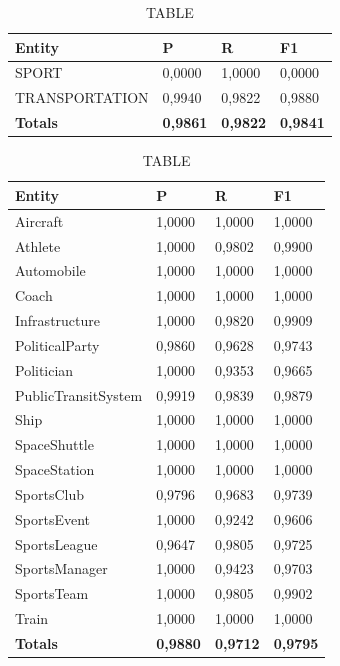 \documentclass[thesis=M,english]{FITthesis}[2018/05/30]
\begin{document}
	\begin{table}[H]\centering
		\caption{TABLE}
		\label{}
		\begin{tabular}{|l|l|l|l|}
			\hline {\textbf{Entity}} & {\textbf{P}} & {\textbf{R}} & {\textbf{F1}}\\\hline
				SPORT & 0,0000 & 1,0000 & 0,0000\\
				TRANSPORTATION & 0,9940 & 0,9822 & 0,9880\\\hline
				\textbf{Totals} & \textbf{0,9861} & \textbf{0,9822} & \textbf{0,9841}\\\hline
		\end{tabular}
	\end{table}	
		


\begin{table}[H]\centering
		\caption{TABLE}
		\label{}
		\begin{tabular}{|l|l|l|l|}
			\hline {\textbf{Entity}} & {\textbf{P}} & {\textbf{R}} & {\textbf{F1}}\\\hline
				Aircraft & 1,0000 & 1,0000 & 1,0000\\
				Athlete & 1,0000 & 0,9802 & 0,9900\\
				Automobile & 1,0000 & 1,0000 & 1,0000\\ 
				Coach & 1,0000 & 1,0000 & 1,0000\\
				Infrastructure & 1,0000 & 0,9820 & 0,9909\\
				PoliticalParty & 0,9860 & 0,9628 & 0,9743\\
				Politician & 1,0000 & 0,9353 & 0,9665\\
				PublicTransitSystem & 0,9919 & 0,9839 & 0,9879\\
				Ship & 1,0000 & 1,0000 & 1,0000\\
				SpaceShuttle & 1,0000 & 1,0000 & 1,0000\\
				SpaceStation & 1,0000 & 1,0000 & 1,0000\\ 
				SportsClub & 0,9796 & 0,9683 & 0,9739\\
				SportsEvent & 1,0000 & 0,9242 & 0,9606\\
				SportsLeague & 0,9647 & 0,9805 & 0,9725\\
				SportsManager & 1,0000 & 0,9423 & 0,9703\\
				SportsTeam & 1,0000 & 0,9805 & 0,9902\\
				Train & 1,0000 & 1,0000 & 1,0000\\\hline
				\textbf{Totals} & \textbf{0,9880} & \textbf{0,9712} & \textbf{0,9795}\\\hline
		\end{tabular}
	\end{table}
\end{document}
